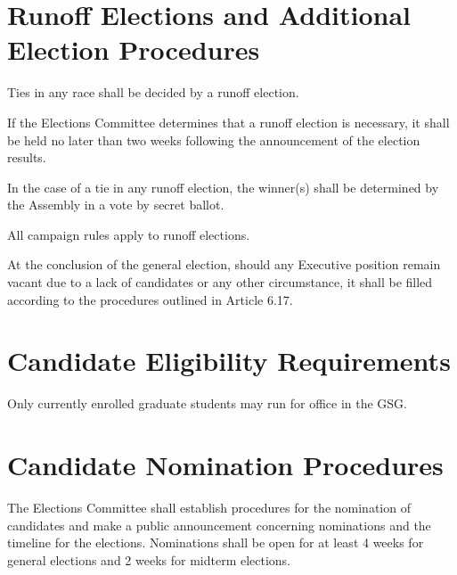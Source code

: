 \section{Runoff Elections and Additional Election Procedures}
\begin{bylaws-number}
  \item Ties in any race shall be decided by a runoff election.
  \item If the Elections Committee determines that a runoff election is necessary, it shall be held no later than two weeks following the announcement of the election results.
  \item In the case of a tie in any runoff election, the winner(s) shall be determined by the Assembly in a vote by secret ballot.
  \item All campaign rules apply to runoff elections.
  \item At the conclusion of the general election, should any Executive position remain vacant due to a lack of candidates or any other circumstance, it shall be filled according to the procedures outlined in Article 6.17.
\end{bylaws-number}

\section{Candidate Eligibility Requirements}
Only currently enrolled graduate students may run for office in the GSG.
 
\section{Candidate Nomination Procedures}
The Elections Committee shall establish procedures for the nomination of candidates and make a public announcement concerning nominations and the timeline for the elections. Nominations shall be open for at least 4 weeks for general elections and 2 weeks for midterm elections.

